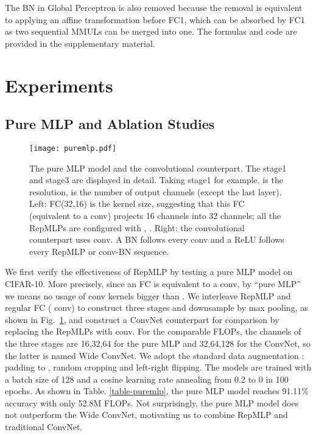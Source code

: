 \documentclass[10pt,twocolumn,letterpaper]{article}
\begin{document}
The BN in Global Perceptron is also removed because the removal is equivalent to applying an affine transformation before FC1, which can be absorbed by FC1 as two sequential MMULs can be merged into one. The formulas and code are provided in the supplementary material.











\section{Experiments}

\subsection{Pure MLP and Ablation Studies}
\begin{figure}
	\begin{center}
		\texttt{[image: puremlp.pdf]}
		\vspace{-0.25in}
		\caption{The pure MLP model and the convolutional counterpart. The stage1 and stage3 are displayed in detail. Taking stage1 for example,  is the resolution,  is the number of output channels (except the last layer). Left: FC(32,16) is the kernel size, suggesting that this FC (equivalent to a  conv) projects 16 channels into 32 channels; all the RepMLPs are configured with , . Right: the convolutional counterpart uses  conv. A BN follows every conv and a ReLU follows every RepMLP or conv-BN sequence.}
		\label{fig-puremlp}
		\vspace{-0.25in}
	\end{center}
\end{figure}

We first verify the effectiveness of RepMLP by testing a pure MLP model on CIFAR-10. More precisely, since an FC is equivalent to a  conv, by ``pure MLP'' we means no usage of conv kernels bigger than . We interleave RepMLP and regular FC ( conv) to construct three stages and downsample by max pooling, as shown in Fig.~\ref{fig-puremlp}, and construct a ConvNet counterpart for comparison by replacing the RepMLPs with  conv. For the comparable FLOPs, the channels of the three stages are 16,32,64 for the pure MLP and 32,64,128 for the ConvNet, so the latter is named Wide ConvNet. We adopt the standard data augmentation \cite{he2016deep}: padding to , random cropping and left-right flipping. The models are trained with a batch size of 128 and a cosine learning rate annealing from 0.2 to 0 in 100 epochs. As shown in Table. \ref{table-puremlp}, the pure MLP model reaches 91.11\% accuracy with only 52.8M FLOPs. Not surprisingly, the pure MLP model does not outperform the Wide ConvNet, motivating us to combine RepMLP and traditional ConvNet. 
\end{document}
